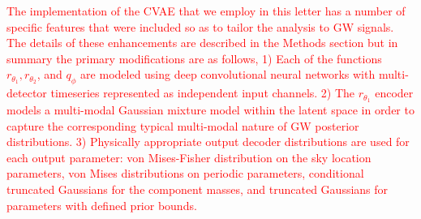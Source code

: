\documentclass[%
showpacs,
nofootinbib,
 amsmath,amssymb,
 aps,
 twocolumn,
 prl,
 reprint,
floatfix,
]{revtex4-1}
\newcommand{\new}[1]{\textcolor{red}{#1}}
\begin{document}
%
%
\new{The implementation of the \ac{CVAE} that we employ in this letter has a
number of specific features that were included so as to tailor the analysis to
\ac{GW} signals. The details of these enhancements are described in the Methods
section but in summary the primary modifications are as follows, 1) Each of the
functions $r_{\theta_1},r_{\theta_2}$, and $q_{\phi}$ are modeled using deep
convolutional neural networks with multi-detector timeseries represented as
independent input channels. 2) The $r_{\theta_1}$ encoder models a multi-modal
Gaussian mixture model within the latent space in order to capture the
corresponding typical multi-modal nature of \ac{GW} posterior distributions. 3)
Physically appropriate output decoder distributions are used for each output
parameter: von Mises-Fisher distribution on the sky location
parameters, von Mises distributions on periodic parameters, conditional
truncated Gaussians for the component masses, and truncated Gaussians for
parameters with defined prior bounds.}  
\end{document}
